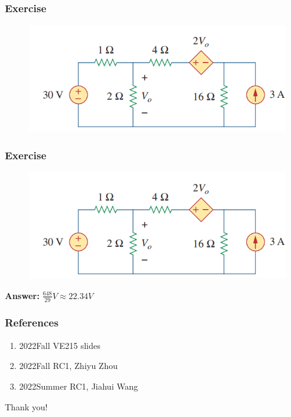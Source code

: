 \documentclass{beamer}
\begin{document}
\begin{frame}
\frametitle{Exercise}
\begin{figure}[H]
        \centering
        \includegraphics[width=1\textwidth]{ycy/exer.png}
    \end{figure}
\end{frame}

\begin{frame}
\frametitle{Exercise}
\begin{figure}[H]
        \centering
        \includegraphics[width=1\textwidth]{ycy/exer.png}
    \end{figure}
\centerline{\textbf{Answer:} $\frac{648}{29} V \approx 22.34V$ }
\end{frame}






\begin{frame}
\frametitle{References}
\begin{enumerate}
\item 2022Fall VE215 slides
\item 2022Fall RC1, Zhiyu Zhou
\item 2022Summer RC1, Jiahui Wang
\end{enumerate}
\end{frame}


\begin{frame}
\Huge{\centerline{Thank you!}}
\end{frame}
\end{document}
